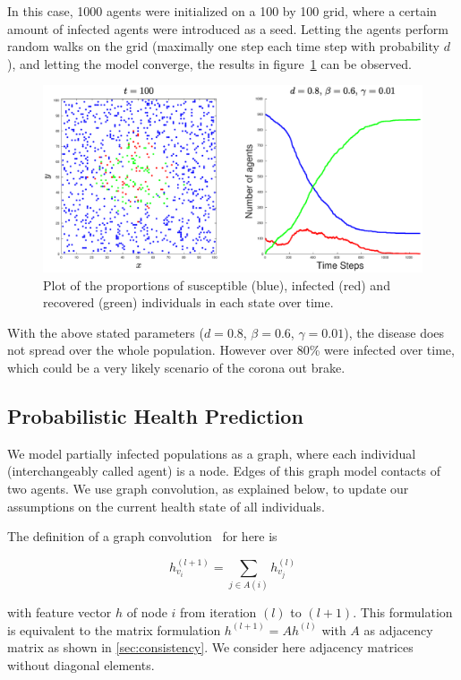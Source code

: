 In this case, 1000 agents were initialized on a 100 by 100 grid, where a certain amount of infected agents were introduced as a seed. Letting the agents perform random walks on the grid (maximally one step each time step with probability $d$), and letting the model converge, the results in figure~\ref{fig:2} can be observed.

\begin{figure}[H]
    \centering
    \includegraphics[width=0.9\linewidth]{1_1000_agents}
    \caption{Plot of the proportions of susceptible (blue), infected (red) and recovered (green) individuals in each state over time.}%
    \label{fig:2}
\end{figure}

With the above stated parameters ($d=0.8$, $\beta=0.6$, $\gamma=0.01$), the disease does not spread over the whole population. However over 80\% were infected over time, which could be a very likely scenario of the corona out brake.


\subsection{Probabilistic Health Prediction}

We model partially infected populations as a graph, where each individual (interchangeably called agent) is a node. Edges of this graph model contacts of two agents. We use graph convolution, as explained below, to update our assumptions on the current health state of all individuals.

The definition of a graph convolution~\cite{Kipf2017SemiSupervisedCW} for here is

\begin{equation}
	\label{eq:graph_convolution}
	h_{v_i}^{(l+1)} = \sum_{j\in A(i)} h_{v_j}^{(l)}
\end{equation}

with feature vector $h$ of node $i$ from iteration $(l)$ to $(l+1)$. This formulation is equivalent to the matrix formulation $h^{(l+1)} = A h^{(l)}$ with $A$ as adjacency matrix as shown in \cref{sec:consistency}. We consider here adjacency matrices without diagonal elements.

